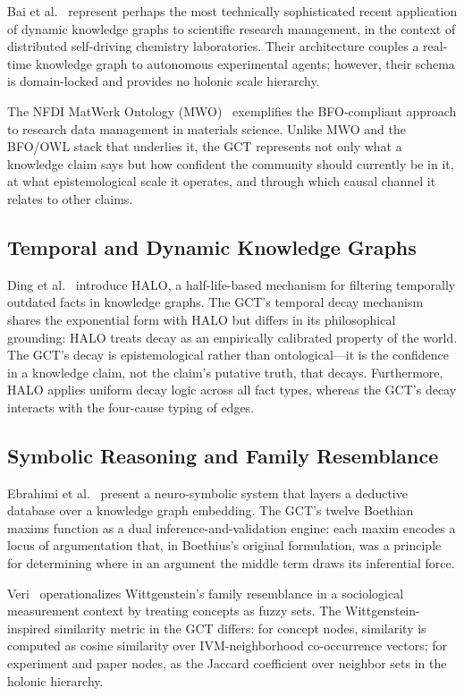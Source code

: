 \documentclass{iosart2x}
\begin{document}
Bai et al.~\cite{bai2024dynamic} represent perhaps the most technically sophisticated recent application of dynamic knowledge graphs to scientific research management, in the context of distributed self-driving chemistry laboratories. Their architecture couples a real-time knowledge graph to autonomous experimental agents; however, their schema is domain-locked and provides no holonic scale hierarchy.

The NFDI MatWerk Ontology (MWO)~\cite{beygi2025nfdi} exemplifies the BFO-compliant approach to research data management in materials science. Unlike MWO and the BFO/OWL stack that underlies it, the GCT represents not only what a knowledge claim says but how confident the community should currently be in it, at what epistemological scale it operates, and through which causal channel it relates to other claims.

\subsection{Temporal and Dynamic Knowledge Graphs}

Ding et al.~\cite{ding2025halo} introduce HALO, a half-life-based mechanism for filtering temporally outdated facts in knowledge graphs. The GCT's temporal decay mechanism shares the exponential form with HALO but differs in its philosophical grounding: HALO treats decay as an empirically calibrated property of the world. The GCT's decay is epistemological rather than ontological---it is the confidence in a knowledge claim, not the claim's putative truth, that decays. Furthermore, HALO applies uniform decay logic across all fact types, whereas the GCT's decay interacts with the four-cause typing of edges.

\subsection{Symbolic Reasoning and Family Resemblance}

Ebrahimi et al.~\cite{ebrahimi2024neurosymbolic} present a neuro-symbolic system that layers a deductive database over a knowledge graph embedding. The GCT's twelve Boethian maxims function as a dual inference-and-validation engine: each maxim encodes a locus of argumentation that, in Boethius's original formulation, was a principle for determining where in an argument the middle term draws its inferential force.

Veri~\cite{veri2023family} operationalizes Wittgenstein's family resemblance in a sociological measurement context by treating concepts as fuzzy sets. The Wittgenstein-inspired similarity metric in the GCT differs: for concept nodes, similarity is computed as cosine similarity over IVM-neighborhood co-occurrence vectors; for experiment and paper nodes, as the Jaccard coefficient over neighbor sets in the holonic hierarchy.
\end{document}
